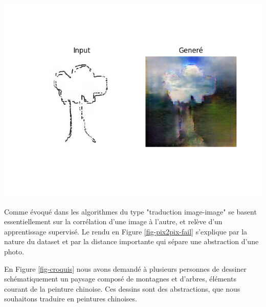 \documentclass[a4paper, 12pt]{report}
\begin{document}
\begin{center}
\includegraphics[width=0.7\linewidth]{images/pix2pix-fail.png}
\label{fig-pix2pix-fail}
\end{center}

Comme évoqué dans \cite{DBLP:journals/corr/abs-1805-00247} les algorithmes du type "traduction image-image" se basent essentiellement sur la corrélation d'une image à l'autre, et relève d'un apprentissage supervisé. Le rendu en Figure \ref{fig-pix2pix-fail} s'explique par la nature du dataset et par la distance importante qui sépare une abstraction d'une photo. 

En Figure \ref{fig-croquis} nous avons demandé à plusieurs personnes de dessiner schématiquement un paysage composé de montagnes et d'arbres, éléments courant de la peinture chinoise. Ces dessins sont des abstractions, que nous souhaitons traduire en peintures chinoises.
\end{document}
